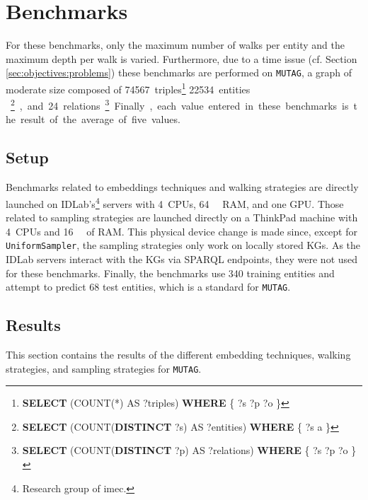 
\chapter{Benchmarks}
\label{chap:benchmarks}

For these benchmarks, only the maximum number of walks per entity and the
maximum depth per walk is varied. Furthermore, due to a time issue (cf. Section
\ref{sec:objectives:problems}) these benchmarks are performed on \texttt{MUTAG},
a graph of moderate size composed of
\SI{74567}{triples}\footnote{\textbf{SELECT} (COUNT(*) AS ?triples)
\textbf{WHERE} \{ ?s ?p ?o \}} \SI{22534}{entities }\footnote{\textbf{SELECT}
(COUNT(\textbf{DISTINCT} ?s) AS ?entities) \textbf{WHERE} \{ ?s a \}}, and
\SI{24}{relations}\footnote{\textbf{SELECT} (COUNT(\textbf{DISTINCT} ?p) AS
?relations) \textbf{WHERE} \{ ?s ?p ?o \}}. Finally, each value entered in these
benchmarks is the result of the average of five values.

\section{Setup}
\label{sec:setup}

Benchmarks related to embeddings techniques and walking strategies are directly
launched on IDLab's\footnote{Research group of imec.} servers with \SI{4}{CPUs},
\SI{64}{\giga\byte} RAM, and one GPU. Those related to sampling strategies are
launched directly on a ThinkPad machine with \SI{4}{CPUs} and
\SI{16}{\giga\byte} of RAM. This physical device change is made since, except
for \texttt{UniformSampler}, the sampling strategies only work on locally stored
KGs. As the IDLab servers interact with the KGs via SPARQL endpoints, they were
not used for these benchmarks. Finally, the benchmarks use 340 training entities
and attempt to predict 68 test entities, which is a standard for \texttt{MUTAG}.

\section{Results}
\label{sec:results}

This section contains the results of the different embedding techniques, walking
strategies, and sampling strategies for \texttt{MUTAG}.





